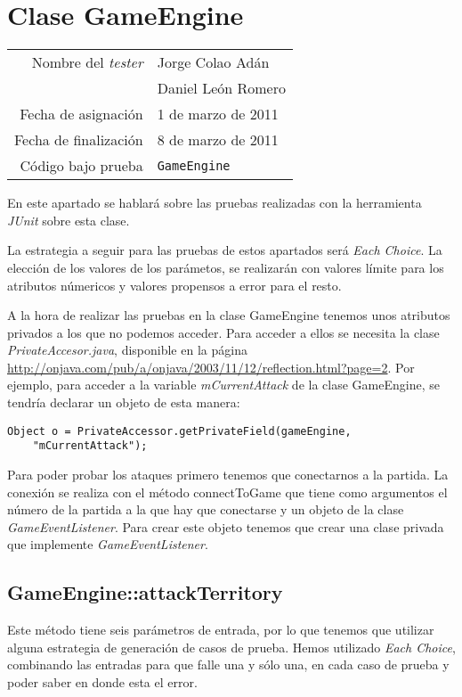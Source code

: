 \section{Clase GameEngine}

{\small
\begin{tabular}{r|l}
Nombre del \textit{tester} & Jorge Colao Adán \\
& Daniel León Romero\\
Fecha de asignación & 1 de marzo de 2011 \\
Fecha de finalización & 8 de marzo de 2011 \\
Código bajo prueba & \texttt{GameEngine}
\end{tabular}
}

En este apartado se hablará sobre las pruebas realizadas con la herramienta \textit{JUnit} sobre esta clase.

La estrategia a seguir para las pruebas de estos apartados será \textit{Each Choice}. La elección de los valores de los parámetos, se realizarán con valores límite para los atributos númericos y valores propensos a error para el resto.

A la hora de realizar las pruebas en la clase GameEngine tenemos unos atributos privados a los que no podemos acceder. Para acceder a ellos se necesita la clase \textit{PrivateAccesor.java}, disponible en la página \url{http://onjava.com/pub/a/onjava/2003/11/12/reflection.html?page=2}. Por ejemplo, para acceder a la variable \textit{mCurrentAttack} de la clase GameEngine, se tendría declarar un objeto de esta manera:
\begin{verbatim}
Object o = PrivateAccessor.getPrivateField(gameEngine, 
	"mCurrentAttack");
\end{verbatim}

Para poder probar los ataques primero tenemos que conectarnos a la partida. La conexión se realiza con el método connectToGame que tiene como argumentos el número de la partida a la que hay que conectarse y un objeto de la clase \textit{GameEventListener}. Para crear este objeto tenemos que crear una clase privada que implemente \textit{GameEventListener}.

\subsection{GameEngine::attackTerritory}

Este método tiene seis parámetros de entrada, por lo que tenemos que utilizar alguna estrategia de generación de casos de prueba. Hemos utilizado \textit{Each Choice}, combinando las entradas para que falle una y sólo una, en cada caso de prueba y poder saber en donde esta el error.


